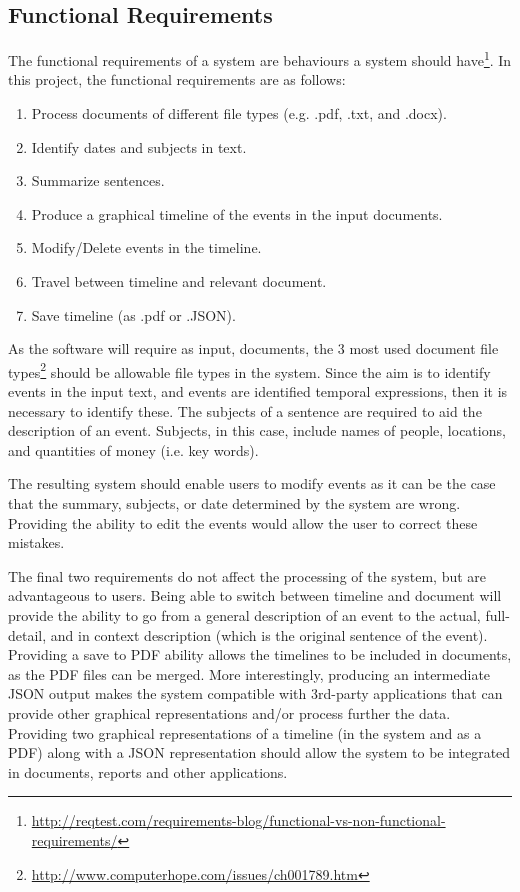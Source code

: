 \subsection{Functional Requirements}
\par The functional requirements of a system are behaviours a system should have\footnote{\url{http://reqtest.com/requirements-blog/functional-vs-non-functional-requirements/}}. In this project, the functional requirements are as follows:
\begin{enumerate}
\item Process documents of different file types (e.g. .pdf, .txt, and .docx).
\item Identify dates and subjects in text.
\item Summarize sentences.
\item Produce a graphical timeline of the events in the input documents.
\item Modify/Delete events in the timeline.
\item Travel between timeline and relevant document.
\item Save timeline (as .pdf or .JSON).
\end{enumerate} 
\par As the software will require as input, documents, the 3 most used document file types\footnote{\url{http://www.computerhope.com/issues/ch001789.htm}} should be allowable file types in the system. Since the aim is to identify events in the input text, and events are identified temporal expressions, then it is necessary to identify these. The subjects of a sentence are required to  aid the description of an event. Subjects, in this case, include names of people, locations, and quantities of money (i.e. key words).
\par The resulting system should enable users to modify events as it can be the case that the summary, subjects, or date determined by the system are wrong. Providing the ability to edit the events would allow the user to correct these mistakes. 
\par The final two requirements do not affect the processing of the system, but are advantageous to users. Being able to switch between timeline and document will provide the ability to go from a general description of an event to the actual, full-detail, and in context description (which is the original sentence of the event). Providing a save to PDF ability allows the timelines to be included in documents, as the PDF files can be merged. More interestingly, producing an intermediate JSON output makes the system compatible with 3rd-party applications that can provide other graphical representations and/or process further the data. Providing two graphical representations of a timeline (in the system and as a PDF) along with a JSON representation should allow the system to be integrated in documents, reports and other applications.

